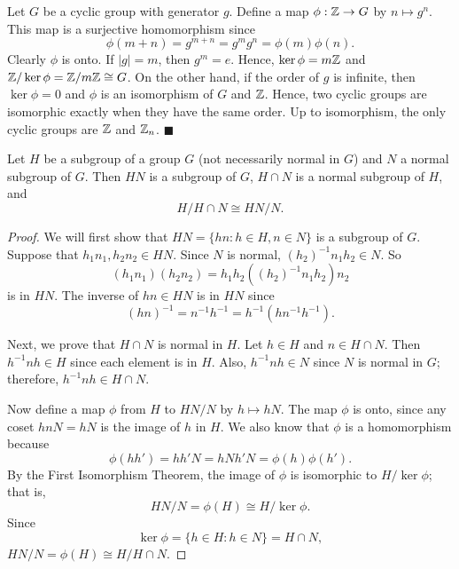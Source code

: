 
\vspace{ 2 ex }
 
 
Let $G$ be a cyclic group with generator $g$. Define a map $\phi :
{\Bbb Z} \rightarrow G$ by $n \mapsto g^n$.  This map is a surjective
homomorphism since  
$$
\phi( m + n) = g^{m+n} = g^m g^n = \phi(m) \phi(n).
$$
Clearly $\phi$ is onto. If $|g| = m$, then  $g^m = e$. Hence, $\ker
\phi = m {\Bbb Z}$ and ${\Bbb Z} / \ker \phi =  {\Bbb Z} / m {\Bbb Z}
\cong G$. On the other hand, if the order of $g$ is infinite, then
$\ker \phi = 0$ and $\phi$ is an isomorphism of $G$ and ${\Bbb Z}$.
Hence, two cyclic groups are isomorphic exactly when they have the
same order. Up to isomorphism, the only cyclic groups are ${\Bbb Z}$
and ${\Bbb Z}_n$. 
\hspace{\fill} $\blacksquare$
 
 
\begin{theorem}
Let  $H$ be a subgroup of a group $G$ (not necessarily normal in $G$)
and $N$ a normal subgroup of $G$.  Then $HN$ is a subgroup of $G$,
$H \cap N$ is a normal subgroup of $H$, and 
$$
H / H \cap N \cong HN /N.
$$
\end{theorem}
 
 
\begin{proof}
We will first show that $HN = \{ hn : h \in H, n \in N \}$ is a
subgroup of $G$.  Suppose that  $h_1 n_1, h_2 n_2 \in HN$. Since 
$N$ is normal, $(h_2)^{-1} n_1 h_2 \in N$. So 
$$
(h_1 n_1)(h_2 n_2) = h_1 h_2 ( (h_2)^{-1} n_1 h_2 )n_2
$$
is in $HN$. The inverse of $hn \in HN$ is in $HN$ since
$$
( hn )^{-1} = n^{-1 } h^{-1} = h^{-1} (h n^{-1} h^{-1} ).
$$
 
 
Next, we prove that $H \cap N$ is normal in $H$. Let $h \in H$ and $n
\in H \cap N$. Then $h^{-1} n h \in H$ since each element is in $H$.
Also, $h^{-1} n h \in N$ since $N$ is normal in $G$; therefore,
$h^{-1} n h \in H \cap N$. 
 
 
Now define a map $\phi$ from $H$ to $ HN / N$ by $h \mapsto h N$. The
map $\phi$ is onto, since any coset $h n N = h N$ is the image of $h$
in $H$. We also know that $\phi$ is a homomorphism because 
$$
\phi( h  h')  = h h' N =  h N h' N =  \phi( h ) \phi( h').
$$
By the First Isomorphism Theorem, the image of $\phi$ is isomorphic to
$H / \ker \phi$; that is,
$$
HN/N = \phi(H) \cong H / \ker \phi.
$$
Since
$$
\ker \phi = \{ h \in H : h \in N \} = H \cap N,
$$
$HN/N = \phi(H) \cong H / H \cap N$.
\end{proof}
 
